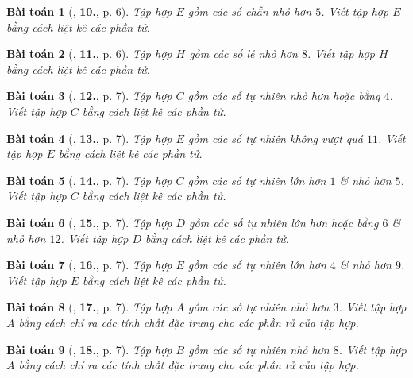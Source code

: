 \documentclass{article}
\numberwithin{equation}{section}
\newtheorem{baitoan}{Bài toán}[section]
\begin{document}
\begin{baitoan}[\cite{Trong_Toan_6_2021}, \textbf{10.}, p. 6]
	Tập hợp $E$ gồm các số chẵn nhỏ hơn $5$. Viết tập hợp $E$ bằng cách liệt kê các phần tử.
\end{baitoan}

\begin{baitoan}[\cite{Trong_Toan_6_2021}, \textbf{11.}, p. 6]
	Tập hợp $H$ gồm các số lẻ nhỏ hơn $8$. Viết tập hợp $H$ bằng cách liệt kê các phần tử.
\end{baitoan}

\begin{baitoan}[\cite{Trong_Toan_6_2021}, \textbf{12.}, p. 7]
	Tập hợp $C$ gồm các số tự nhiên nhỏ hơn hoặc bằng $4$. Viết tập hợp $C$ bằng cách liệt kê các phần tử.
\end{baitoan}

\begin{baitoan}[\cite{Trong_Toan_6_2021}, \textbf{13.}, p. 7]
	Tập hợp $E$ gồm các số tự nhiên không vượt quá $11$. Viết tập hợp $E$ bằng cách liệt kê các phần tử.
\end{baitoan}

\begin{baitoan}[\cite{Trong_Toan_6_2021}, \textbf{14.}, p. 7]
	Tập hợp $C$ gồm các số tự nhiên lớn hơn $1$ \& nhỏ hơn $5$. Viết tập hợp $C$ bằng cách liệt kê các phần tử.
\end{baitoan}

\begin{baitoan}[\cite{Trong_Toan_6_2021}, \textbf{15.}, p. 7]
	Tập hợp $D$ gồm các số tự nhiên lớn hơn hoặc bằng $6$ \& nhỏ hơn $12$. Viết tập hợp $D$ bằng cách liệt kê các phần tử.
\end{baitoan}

\begin{baitoan}[\cite{Trong_Toan_6_2021}, \textbf{16.}, p. 7]
	Tập hợp $E$ gồm các số tự nhiên lớn hơn $4$ \& nhỏ hơn $9$. Viết tập hợp $E$ bằng cách liệt kê các phần tử.
\end{baitoan}

\begin{baitoan}[\cite{Trong_Toan_6_2021}, \textbf{17.}, p. 7]
	Tập hợp $A$ gồm các số tự nhiên nhỏ hơn $3$. Viết tập hợp $A$ bằng cách chỉ ra các tính chất đặc trưng cho các phần tử của tập hợp.
\end{baitoan}

\begin{baitoan}[\cite{Trong_Toan_6_2021}, \textbf{18.}, p. 7]
	Tập hợp $B$ gồm các số tự nhiên nhỏ hơn $8$. Viết tập hợp $A$ bằng cách chỉ ra các tính chất đặc trưng cho các phần tử của tập hợp.
\end{baitoan}
\end{document}
